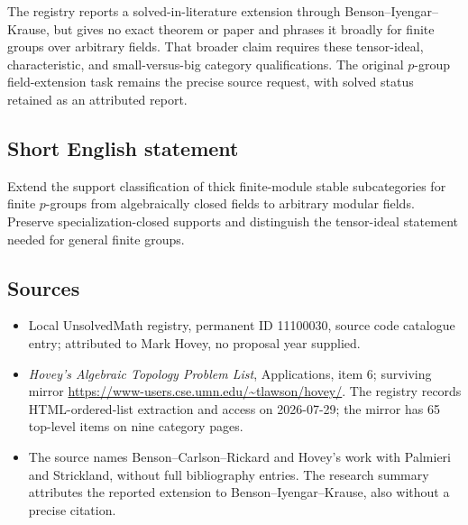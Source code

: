 \documentclass[11pt]{article}
\begin{document}
The registry reports a solved-in-literature extension through Benson--Iyengar--Krause, but gives no exact theorem or paper and phrases it broadly for finite groups over arbitrary fields. That broader claim requires these tensor-ideal, characteristic, and small-versus-big category qualifications. The original $p$-group field-extension task remains the precise source request, with solved status retained as an attributed report.
\subsection{Short English statement}
Extend the support classification of thick finite-module stable subcategories for finite $p$-groups from algebraically closed fields to arbitrary modular fields. Preserve specialization-closed supports and distinguish the tensor-ideal statement needed for general finite groups.
\subsection{Sources}
\begin{itemize}
\item Local UnsolvedMath registry, permanent ID 11100030, source code catalogue entry; attributed to Mark Hovey, no proposal year supplied.
\item \emph{Hovey's Algebraic Topology Problem List}, Applications, item 6; surviving mirror \url{https://www-users.cse.umn.edu/~tlawson/hovey/}. The registry records HTML-ordered-list extraction and access on 2026-07-29; the mirror has 65 top-level items on nine category pages.
\item The source names Benson--Carlson--Rickard and Hovey's work with Palmieri and Strickland, without full bibliography entries. The research summary attributes the reported extension to Benson--Iyengar--Krause, also without a precise citation.
\end{itemize}
\end{document}
